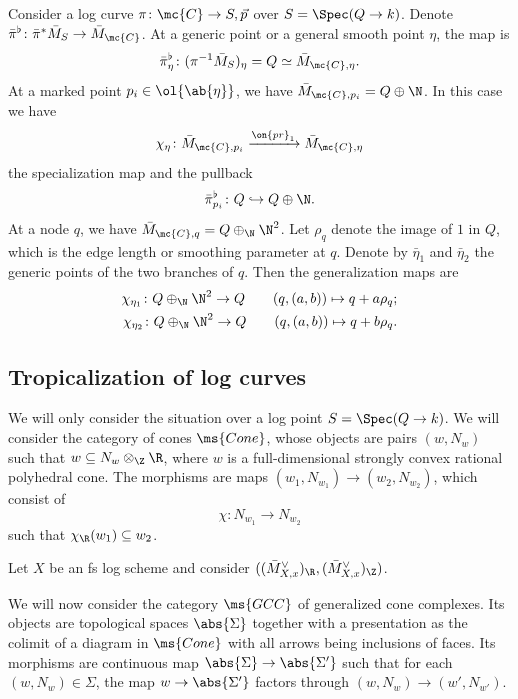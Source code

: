 Consider a log curve \(\pi \colon \mc{C} \to S, \vec{p}\) over \(S = \Spec (Q \to k)\). Denote \(\bar{\pi}^{\flat} \colon \bar{\pi}^* \bar{M}_S \to \bar{M}_{\mc{C}}\). At a generic point or a general smooth point \(\eta\), the map is
\[ \bar{\pi}_{\eta}^{\flat} \colon (\pi^{-1} \bar{M}_S)_{\eta} = Q \simeq \bar{M}_{\mc{C}, \eta}. \]
At a marked point \(p_i \in \ol{\ab\{\eta\}}\), we have \(\bar{M}_{\mc{C}, p_i} = Q \oplus \N\). In this case we have
\[ \chi_{\eta} \colon \bar{M}_{\mc{C}, p_i} \xrightarrow{\on{pr}_1} \bar{M}_{\mc{C}, \eta} \]
the specialization map and the pullback
\[ \bar{\pi}_{p_i}^{\flat} \colon Q \hookrightarrow Q \oplus \N. \]
At a node \(q\), we have \(\bar{M}_{\mc{C}, q} = Q \oplus_{\N} \N^2\). Let \(\rho_q\) denote the image of \(1\) in \(Q\), which is the edge length or smoothing parameter at \(q\). Denote by \(\bar{\eta}_1\) and \(\bar{\eta}_2\) the generic points of the two branches of \(q\). Then the generalization maps are
\begin{align*}
    \chi_{\eta_1} \colon Q \oplus_{\N} \N^2 \to Q \qquad (q, (a,b)) \mapsto q + a \rho_q ;\\
    \chi_{\eta_2} \colon Q \oplus_{\N} \N^2 \to Q \qquad (q, (a,b)) \mapsto q + b \rho_q .
\end{align*}

\subsection{Tropicalization of log curves}%
\label{sub:Tropicalization of log curves}

We will only consider the situation over a log point \(S = \Spec(Q \to k)\). We will consider the category of cones \(\ms{Cone}\), whose objects are pairs \((w, N_w)\) such that \(w \subseteq N_w \otimes_{\Z} \R\), where \(w\) is a full-dimensional strongly convex rational polyhedral cone. The morphisms are maps \((w_1, N_{w_1}) \to (w_2, N_{w_2})\), which consist of
\[ \chi \colon N_{w_1} \to N_{w_2} \]
such that \(\chi_{\R}(w_1) \subseteq w_2\). 

\begin{exm}
    Let \(X\) be an fs log scheme and consider \(( (\bar{M}_{X,x}^{\vee})_{\R}, (\bar{M}_{X,x}^{\vee})_{\Z} )\).
\end{exm}

We will now consider the category \(\ms{GCC}\) of generalized cone complexes. Its objects are topological spaces \(\abs{\Sigma}\) together with a presentation as the colimit of a diagram in \(\ms{Cone}\) with all arrows being inclusions of faces. Its morphisms are continuous map \(\abs{\Sigma} \to \abs{\Sigma'}\) such that for each \((w, N_w) \in \Sigma\), the map \(w \to \abs{\Sigma'}\) factors through \((w, N_w) \to (w', N_{w'})\).

